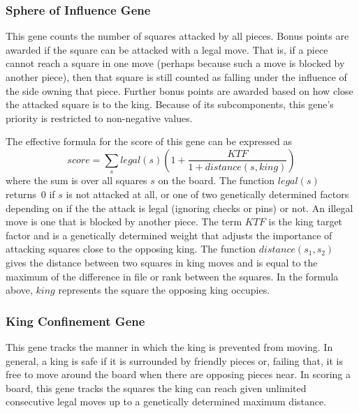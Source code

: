 \documentclass[letterpaper]{article}
\renewcommand{\_}{\allowbreak\textunderscore\allowbreak}
\begin{document}
\subsubsection{Sphere of Influence Gene}
This gene counts the number of squares attacked by all pieces. Bonus points are awarded if the square can be attacked with a legal move. That is, if a piece cannot reach a square in one move (perhaps because such a move is blocked by another piece), then that square is still counted as falling under the influence of the side owning that piece. Further bonus points are awarded based on how close the attacked square is to the king. Because of its subcomponents, this gene's priority is restricted to non-negative values.

The effective formula for the score of this gene can be expressed as
\[score = \sum_s legal(s)\left(1+\frac{KTF}{1+distance(s,king)}\right)\]
where the sum is over all squares \(s\) on the board. The function \(legal(s)\) returns~0 if \(s\) is not attacked at all, or one of two genetically determined factors depending on if the the attack is legal (ignoring checks or pins) or not. An illegal move is one that is blocked by another piece. The term \(KTF\) is the king target factor and is a genetically determined weight that adjusts the importance of attacking squares close to the opposing king. The function \(distance(s_1, s_2)\) gives the distance between two squares in king moves and is equal to the maximum of the difference in file or rank between the squares. In the formula above, \(king\) represents the square the opposing king occupies.

\subsubsection{King Confinement Gene}
This gene tracks the manner in which the king is prevented from moving. In general, a king is safe if it is surrounded by friendly pieces or, failing that, it is free to move around the board when there are opposing pieces near. In scoring a board, this gene tracks the squares the king can reach given unlimited consecutive legal moves up to a genetically determined maximum distance.
\end{document}
